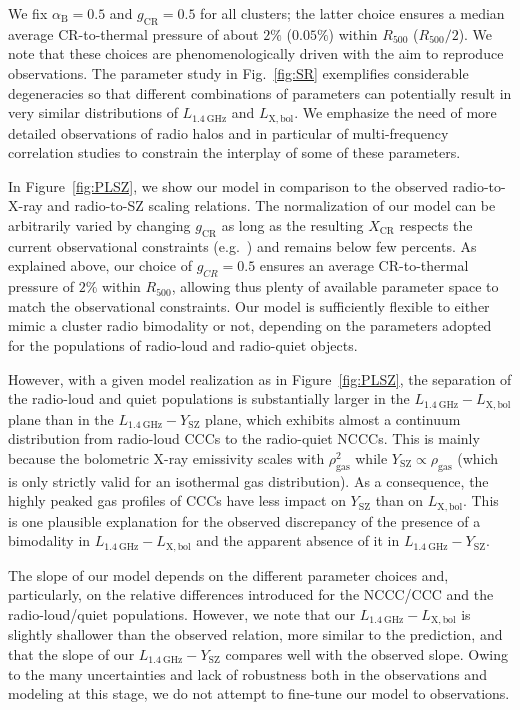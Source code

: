\documentclass[traditabstract]{aa}
\newcommand{\rmn}{\mathrm}
\begin{document}
We fix $\alpha_{\rmn{B}}=0.5$ and $g_{\rmn{CR}}=0.5$ for all clusters; the
latter choice ensures a median average CR-to-thermal pressure of about $2\%$
($0.05\%$) within $R_{500}$ ($R_{500}/2$). We note that these choices are
phenomenologically driven with the aim to reproduce observations. The parameter
study in Fig.~\ref{fig:SR} exemplifies considerable degeneracies so that
different combinations of parameters can potentially result in very similar
distributions of $L_{1.4~\rmn{GHz}}$ and $L_{\rmn{X,bol}}$. We emphasize the
need of more detailed observations of radio halos and in particular of
multi-frequency correlation studies to constrain the interplay of some of these
parameters. 

In Figure~\ref{fig:PLSZ}, we show our model in comparison to the observed
radio-to-X-ray and radio-to-SZ scaling relations. The normalization of our model
can be arbitrarily varied by changing $g_{\rmn{CR}}$ as long as the resulting
$X_{\rmn{CR}}$ respects the current observational constraints
(e.g.~\citealp{2011arXiv1111.5544M}) and remains below few percents. As
explained above, our choice of $g_{CR}=0.5$ ensures an average CR-to-thermal
pressure of $2\%$ within $R_{500}$, allowing thus plenty of available parameter
space to match the observational constraints.  Our model is sufficiently
flexible to either mimic a cluster radio bimodality or not, depending on the
parameters adopted for the populations of radio-loud and radio-quiet
objects. 

However, with a given model realization as in Figure~\ref{fig:PLSZ}, the
separation of the radio-loud and quiet populations is substantially larger in
the $L_{1.4~\rmn{GHz}}-L_{\rmn{X,bol}}$ plane than in the
$L_{1.4~\rmn{GHz}}-Y_{\rmn{SZ}}$ plane, which exhibits almost a continuum
distribution from radio-loud CCCs to the radio-quiet NCCCs. This is mainly
because the bolometric X-ray emissivity scales with $\rho_{\rmn{gas}}^2$ while
$Y_{\rmn{SZ}}\propto\rho_{\rmn{gas}}$ (which is only strictly valid for an
isothermal gas distribution). As a consequence, the highly peaked gas profiles
of CCCs have less impact on $Y_{\rmn{SZ}}$ than on $L_{\rmn{X,bol}}$. This is
one plausible explanation for the observed discrepancy of the presence of a
bimodality in $L_{1.4~\rmn{GHz}}-L_{\rmn{X,bol}}$ and the apparent absence of it
in $L_{1.4~\rmn{GHz}}-Y_{\rmn{SZ}}$. 

The slope of our model depends on the different parameter choices and,
particularly, on the relative differences introduced for the NCCC/CCC and the
radio-loud/quiet populations. However, we note that our
$L_{1.4~\rmn{GHz}}-L_{\rmn{X,bol}}$ is slightly shallower than the observed
relation, more similar to the \cite{2009JCAP...09..024K} prediction, and that
the slope of our $L_{1.4~\rmn{GHz}}-Y_{\rmn{SZ}}$ compares well with the
observed slope. Owing to the many uncertainties and lack of robustness both in
the observations and modeling at this stage, we do not attempt to fine-tune our
model to observations.
\end{document}
